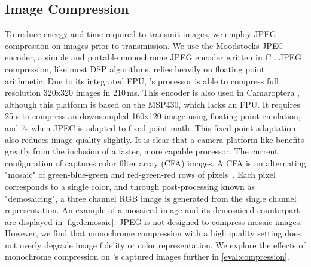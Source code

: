 
\subsection{Image Compression}
To reduce energy and time required to transmit images, we employ JPEG compression on images prior to transmission. We use the Moodstocks JPEC encoder, a simple and portable monochrome JPEG encoder written in C \cite{moodstocks}. JPEG compression, like most DSP algorithms, relies heavily on floating point arithmetic. Due to its integrated FPU, \namec{}'s processor is able to compress full resolution 320x320 images in 210\,ms.
This encoder is also used in Camaroptera \cite{nardello2019camaroptera}, although this platform is based on the MSP430, which lacks an FPU. It requires 25 s to compress an downsampled 160x120 image using floating point emulation, and 7s when JPEC is adapted to fixed point math. This fixed point adaptation also reduces image quality slightly. It is clear that a camera platform like \namec{} benefits greatly from the inclusion of a faster, more capable processor.
The current configuration of \namec captures color filter array (CFA) images. A CFA is an alternating "mosaic" of green-blue-green and red-green-red rows of pixels~\cite{bayer1976color}. Each pixel corresponds to a single color, and through post-processing known as "demosaicing", a three channel RGB image is generated from the single channel representation. An example of a mosaiced image and its demosaiced counterpart are displayed in \cref{fig:demosaic}.
JPEG is not designed to compress mosaic images. However, we find that monochrome compression with a high quality setting does not overly degrade image fidelity or color representation. We explore the effects of monochrome compression on \namec's captured images further in \cref{eval:compression}.


